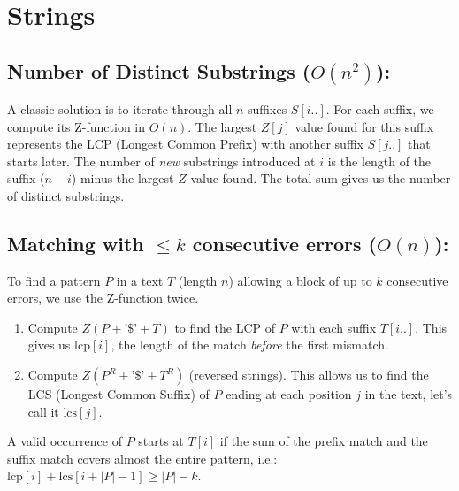 \section{Strings}

\subsection{Number of Distinct Substrings ($O(n^2)$):}
A classic solution is to iterate through all $n$ suffixes $S[i..]$. For each suffix, we compute its Z-function in $O(n)$. The largest $Z[j]$ value found for this suffix represents the LCP (Longest Common Prefix) with another suffix $S[j..]$ that starts later. The number of \textit{new} substrings introduced at $i$ is the length of the suffix ($n-i$) minus the largest $Z$ value found. The total sum gives us the number of distinct substrings.

\subsection{Matching with $\le k$ consecutive errors ($O(n)$):}
To find a pattern $P$ in a text $T$ (length $n$) allowing a block of up to $k$ consecutive errors, we use the Z-function twice.
\begin{enumerate}
    \item Compute $Z(P + \text{'\$'} + T)$ to find the LCP of $P$ with each suffix $T[i..]$. This gives us $\text{lcp}[i]$, the length of the match \textit{before} the first mismatch.
    \item Compute $Z(P^R + \text{'\$'} + T^R)$ (reversed strings). This allows us to find the LCS (Longest Common Suffix) of $P$ ending at each position $j$ in the text, let's call it $\text{lcs}[j]$.
\end{enumerate}
A valid occurrence of $P$ starts at $T[i]$ if the sum of the prefix match and the suffix match covers almost the entire pattern, i.e.: $\text{lcp}[i] + \text{lcs}[i + |P| - 1] \ge |P| - k$.
